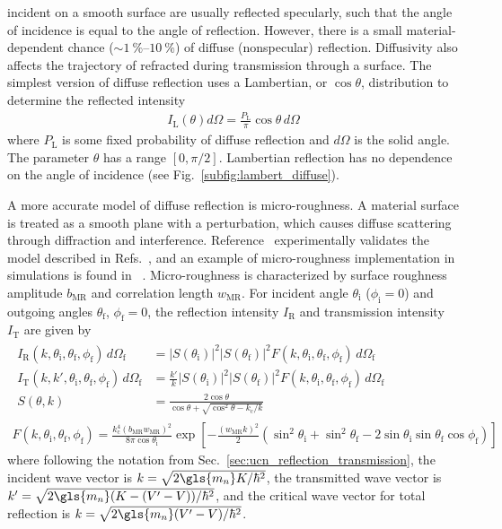 \ucn incident on a smooth surface are usually reflected specularly, such that the angle of incidence is equal to the angle of reflection. However, there is a small material-dependent chance ($\sim\qtyrange{1}{10}{\percent}$) of diffuse (nonspecular) reflection. Diffusivity also affects the trajectory of refracted 
\ucn during transmission through a surface. The simplest version of diffuse reflection uses a Lambertian, or $\cos\theta$, distribution to determine the reflected intensity
%
\begin{gather}
    I_\text{L}(\theta)d\Omega=\frac{P_\text{L}}{\pi}\cos\theta\,d\Omega\label{eq:lambertian_reflection}
\end{gather}
%
where $P_\text{L}$ is some fixed probability of diffuse reflection and $d\Omega$ is the solid angle. The parameter $\theta$ has a range $[0,\pi/2]$. Lambertian reflection has no dependence on the angle of incidence (see Fig.~\ref{subfig:lambert_diffuse}).

A more accurate model of diffuse reflection is micro-roughness. A material surface is treated as a smooth plane with a perturbation, which causes diffuse scattering through diffraction and interference. Reference~\cite{atchison_diffuse_2010} experimentally validates the model described in Refs.~\cite{steyerl_1972, steyerl_surface_2010}, and an example of micro-roughness implementation in \ucn simulations is found in \pentrack~\cite{schreyer_pentrack}. Micro-roughness is characterized by surface roughness amplitude $b_\text{MR}$ and correlation length $w_\text{MR}$. For incident angle $\theta_\text{i}$ ($\phi_\text{i}=0$) and outgoing angles $\theta_\text{f}$, $\phi_\text{f}=0$, the reflection intensity $I_\text{R}$ and transmission intensity $I_\text{T}$ are given by~\cite{steyerl_1972, schreyer_thesis}
%
\begin{gather}
    \begin{align}
        I_\text{R}(k, \theta_\text{i}, \theta_\text{f}, \phi_\text{f})\,d\Omega_\text{f} &=  |S(\theta_\text{i})|^2|S(\theta_\text{f})|^2 F(k,\theta_\text{i}, \theta_\text{f}, \phi_\text{f})\,d\Omega_\text{f} \\
        I_\text{T}(k, k', \theta_\text{i}, \theta_\text{f}, \phi_\text{f})\,d\Omega_\text{f} &=  \frac{k'}{k}|S(\theta_\text{i})|^2|S(\theta_\text{f})|^2 F(k,\theta_\text{i}, \theta_\text{f}, \phi_\text{f})\,d\Omega_\text{f} \\
        S(\theta,k) &= \frac{2\cos\theta}{\cos\theta+\sqrt{\cos^2\theta-k_\text{c}/k}}
    \end{align}\\
    F(k,\theta_\text{i}, \theta_\text{f}, \phi_\text{f}) = \frac{k^4_\text{c}(b_\text{MR}w_\text{MR})^2}{8\pi\cos\theta_\text{i}} \exp \left[-\frac{(w_\text{MR}k)^2}{2} (\sin^2\theta_\text{i}+\sin^2\theta_\text{f} - 2\sin\theta_\text{i}\sin\theta_\text{f}\cos\phi_\text{f})\right]
\end{gather}
%
where following the notation from Sec.~\ref{sec:ucn_reflection_transmission}, the incident \ucn wave vector is $k=\sqrt{2\gls{m_n}K/\hbar^2}$, the transmitted wave vector is $k'=\sqrt{2\gls{m_n}(K - (V'-V))/\hbar^2}$, and the critical wave vector for total reflection is $k=\sqrt{2\gls{m_n}(V'-V)/\hbar^2}$.

